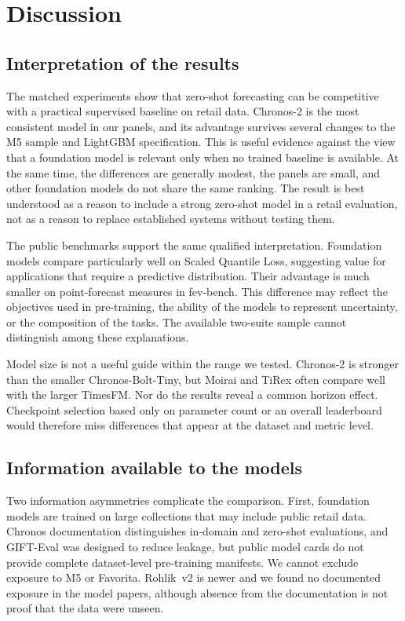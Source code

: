\section{Discussion}
\label{sec:discussion}

\subsection{Interpretation of the results}

The matched experiments show that zero-shot forecasting can be competitive
with a practical supervised baseline on retail data. Chronos-2 is the most
consistent model in our panels, and its advantage survives several changes to
the M5 sample and LightGBM specification. This is useful evidence against the
view that a foundation model is relevant only when no trained baseline is
available. At the same time, the differences are generally modest, the panels
are small, and other foundation models do not share the same ranking. The
result is best understood as a reason to include a strong zero-shot model in a
retail evaluation, not as a reason to replace established systems without
testing them.

The public benchmarks support the same qualified interpretation. Foundation
models compare particularly well on Scaled Quantile Loss, suggesting value for
applications that require a predictive distribution. Their advantage is much
smaller on point-forecast measures in fev-bench. This difference may reflect
the objectives used in pre-training, the ability of the models to represent
uncertainty, or the composition of the tasks. The available two-suite sample
cannot distinguish among these explanations.

Model size is not a useful guide within the range we tested. Chronos-2 is
stronger than the smaller Chronos-Bolt-Tiny, but Moirai and TiRex often compare
well with the larger TimesFM. Nor do the results reveal a common horizon
effect. Checkpoint selection based only on parameter count or an overall
leaderboard would therefore miss differences that appear at the dataset and
metric level.

\subsection{Information available to the models}
\label{subsec:data-leakage}\label{subsec:covariate-gap}

Two information asymmetries complicate the comparison. First, foundation
models are trained on large collections that may include public retail data.
Chronos documentation distinguishes in-domain and zero-shot evaluations, and
GIFT-Eval was designed to reduce leakage, but public model cards do not provide
complete dataset-level pre-training manifests. We cannot exclude exposure to
M5 or Favorita. Rohlik~v2 is newer and we found no documented exposure in the
model papers, although absence from the documentation is not proof that the
data were unseen.

